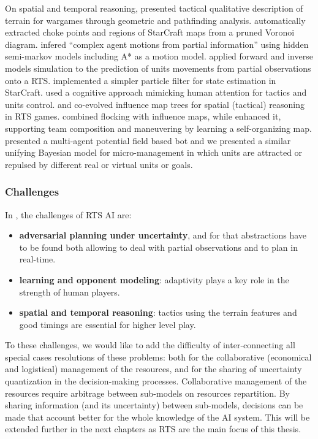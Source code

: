 On spatial and temporal reasoning, \citet{Forbus2002} presented tactical qualitative description of terrain for wargames through geometric and pathfinding analysis. \citet{Perkins2010} automatically extracted choke points and regions of StarCraft maps from a pruned Voronoi diagram. \citet{Southey2007} infered ``complex agent motions from partial information'' using hidden semi-markov models including A* as a motion model. \citet{ButlerCIG10} applied forward and inverse models simulation to the prediction of units movements from partial observations onto a RTS. \citet{weber2011aiide} implemented a simpler particle filter for state estimation in StarCraft. \citet{SORTS} used a cognitive approach mimicking human attention for tactics and units control. \citet{Miles2007} and \citet{SmithCIG10} co-evolved influence map trees for spatial (tactical) reasoning in RTS games. \citet{IntelligentMoving} combined flocking \citep{Reynolds1987} with influence maps, while \citet{teamCompositionRTS} enhanced it, supporting team composition and maneuvering by learning a self-organizing map. \citet{Hagelback2009} presented a multi-agent potential field based bot and we presented a similar unifying Bayesian model for micro-management \citep{SYNNAEVE:Micro} in which units are attracted or repulsed by different real or virtual units or goals.

\subsubsection{Challenges}

In \citep{Buro04callfor}, the challenges of RTS AI are:
\begin{itemize}
    \item \textbf{adversarial planning under uncertainty}, and for that abstractions have to be found both allowing to deal with partial observations and to plan in real-time.
    \item \textbf{learning and opponent modeling}: adaptivity plays a key role in the strength of human players.
    \item \textbf{spatial and temporal reasoning}: tactics using the terrain features and good timings are essential for higher level play.
\end{itemize}
To these challenges, we would like to add the difficulty of inter-connecting all special cases resolutions of these problems: both for the collaborative (economical and logistical) management of the resources, and for the sharing of uncertainty quantization in the decision-making processes. Collaborative management of the resources require arbitrage between sub-models on resources repartition. By sharing information (and its uncertainty) between sub-models, decisions can be made that account better for the whole knowledge of the AI system. This will be extended further in the next chapters as RTS are the main focus of this thesis.


